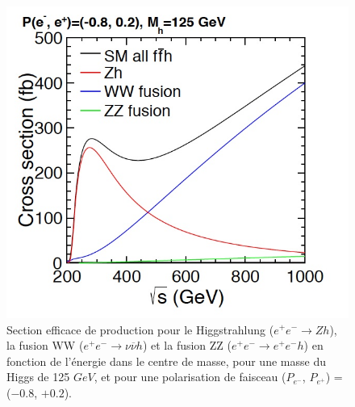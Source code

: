  \begin{figure}[!htb]
    \begin{center} 
      \includegraphics[scale=0.40]{./figures/energy_Higgs.jpg}
      \caption{Section efficace de production pour le Higgstrahlung ($e^+ e^- \rightarrow Z h$), la fusion WW ($e^+ e^- \rightarrow \nu \overline{\nu} h$) et la fusion ZZ ($e^+ e^- \rightarrow e^+ e^- h$) en fonction de l'\'energie dans le centre de masse, pour une masse du Higgs de 125 $GeV$, et pour une polarisation de faisceau ($P_{e^-}$, $P_{e^+}$) = ($-0.8$, $+0.2$). }
     \label{fig:energyHiggs}
     \end{center}
  \end{figure}
   
